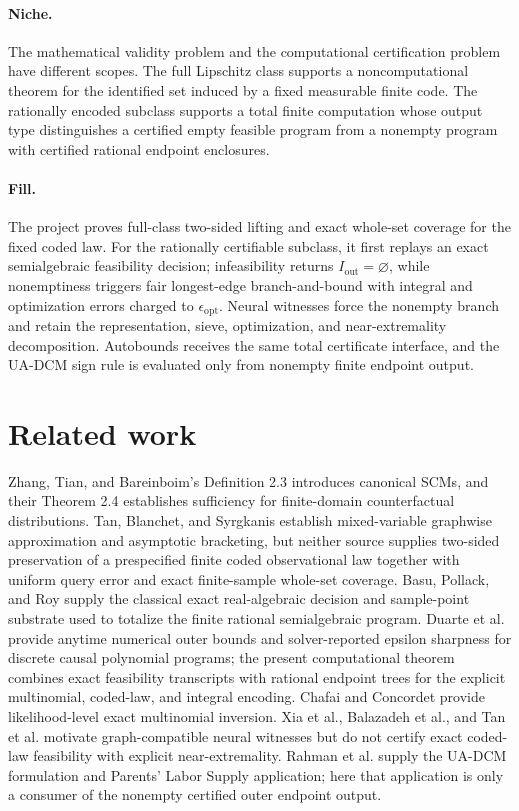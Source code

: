 \documentclass{article}
\begin{document}
\paragraph{Niche.} The mathematical validity problem and the computational certification problem have different scopes. The full Lipschitz class supports a noncomputational theorem for the identified set induced by a fixed measurable finite code. The rationally encoded subclass supports a total finite computation whose output type distinguishes a certified empty feasible program from a nonempty program with certified rational endpoint enclosures.

\paragraph{Fill.} The project proves full-class two-sided lifting and exact whole-set coverage for the fixed coded law. For the rationally certifiable subclass, it first replays an exact semialgebraic feasibility decision; infeasibility returns \(I_{\mathrm{out}}=\varnothing\), while nonemptiness triggers fair longest-edge branch-and-bound with integral and optimization errors charged to \(\epsilon_{\mathrm{opt}}\). Neural witnesses force the nonempty branch and retain the representation, sieve, optimization, and near-extremality decomposition. Autobounds receives the same total certificate interface, and the UA-DCM sign rule is evaluated only from nonempty finite endpoint output.

\section{Related work}

Zhang, Tian, and Bareinboim's Definition 2.3 introduces canonical SCMs, and their Theorem 2.4 establishes sufficiency for finite-domain counterfactual distributions. Tan, Blanchet, and Syrgkanis establish mixed-variable graphwise approximation and asymptotic bracketing, but neither source supplies two-sided preservation of a prespecified finite coded observational law together with uniform query error and exact finite-sample whole-set coverage. Basu, Pollack, and Roy supply the classical exact real-algebraic decision and sample-point substrate used to totalize the finite rational semialgebraic program. Duarte et al. provide anytime numerical outer bounds and solver-reported epsilon sharpness for discrete causal polynomial programs; the present computational theorem combines exact feasibility transcripts with rational endpoint trees for the explicit multinomial, coded-law, and integral encoding. Chafai and Concordet provide likelihood-level exact multinomial inversion. Xia et al., Balazadeh et al., and Tan et al. motivate graph-compatible neural witnesses but do not certify exact coded-law feasibility with explicit near-extremality. Rahman et al. supply the UA-DCM formulation and Parents' Labor Supply application; here that application is only a consumer of the nonempty certified outer endpoint output.
\end{document}
